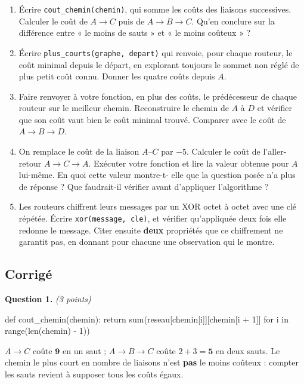 \begin{enumerate}
  \item Écrire \lstinline{cout_chemin(chemin)}, qui somme les coûts des
    liaisons successives. Calculer le coût de $A \rightarrow C$ puis de
    $A \rightarrow B \rightarrow C$. Qu'en conclure sur la différence entre
    « le moins de sauts » et « le moins coûteux » ?

  \item Écrire \lstinline{plus_courts(graphe, depart)} qui renvoie, pour chaque
    routeur, le coût minimal depuis le départ, en explorant toujours le sommet
    non réglé de plus petit coût connu. Donner les quatre coûts depuis $A$.

  \item Faire renvoyer à votre fonction, en plus des coûts, le prédécesseur de
    chaque routeur sur le meilleur chemin. Reconstruire le chemin de $A$ à $D$
    et vérifier que son coût vaut bien le coût minimal trouvé. Comparer avec le
    coût de $A \rightarrow B \rightarrow D$.

  \item On remplace le coût de la liaison $A$--$C$ par $-5$. Calculer le coût
    de l'aller-retour $A \rightarrow C \rightarrow A$. Exécuter votre fonction
    et lire la valeur obtenue pour $A$ lui-même. En quoi cette valeur montre-t-
    elle que la question posée n'a plus de réponse ? Que faudrait-il vérifier
    avant d'appliquer l'algorithme ?

  \item Les routeurs chiffrent leurs messages par un XOR octet à octet avec une
    clé répétée. Écrire \lstinline{xor(message, cle)}, et vérifier qu'appliquée
    deux fois elle redonne le message. Citer ensuite \textbf{deux} propriétés
    que ce chiffrement ne garantit pas, en donnant pour chacune une observation
    qui le montre.
\end{enumerate}

\subsection*{Corrigé}

\textbf{Question 1.} \emph{(3 points)}

\begin{python}
def cout_chemin(chemin):
    return sum(reseau[chemin[i]][chemin[i + 1]]
               for i in range(len(chemin) - 1))
\end{python}

$A \rightarrow C$ coûte $\mathbf{9}$ en un saut ;
$A \rightarrow B \rightarrow C$ coûte $2 + 3 = \mathbf{5}$ en deux sauts. Le
chemin le plus court en nombre de liaisons n'est \textbf{pas} le moins coûteux :
compter les sauts revient à supposer tous les coûts égaux.

